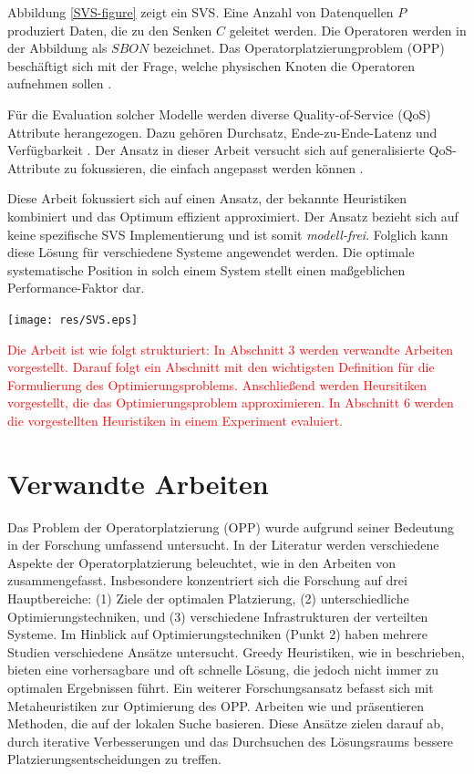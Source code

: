 \documentclass{article}
\begin{document}
Abbildung \ref{SVS-figure} zeigt ein SVS. Eine Anzahl von Datenquellen $P$ produziert Daten, die zu den Senken $C$ geleitet werden. Die Operatoren 
werden in der Abbildung als $SBON$ bezeichnet. Das Operatorplatzierungproblem (OPP) beschäftigt sich mit der Frage, 
welche physischen Knoten die Operatoren aufnehmen sollen \cite{network-aware-op}. 

Für die Evaluation solcher Modelle werden diverse Quality-of-Service (QoS) Attribute herangezogen. 
Dazu gehören Durchsatz, Ende-zu-Ende-Latenz und Verfügbarkeit \cite{efficient-operator-placement,cardellini-optimal_operatorplc}.
Der Ansatz in dieser Arbeit versucht sich auf generalisierte QoS-Attribute 
zu fokussieren, die einfach angepasst werden können \cite{efficient-operator-placement}.

Diese Arbeit fokussiert sich auf einen Ansatz, der bekannte Heuristiken kombiniert und das Optimum effizient approximiert. 
Der Ansatz bezieht sich auf keine spezifische SVS Implementierung und ist somit \textit{modell-frei}. Folglich kann diese Lösung für verschiedene Systeme angewendet werden.
Die optimale systematische Position in solch einem System stellt einen maßgeblichen Performance-Faktor dar. 


\begin{center}
    \texttt{[image: res/SVS.eps]}
    \label{SVS-figure}
\end{center}

\textcolor{red}{Die Arbeit ist wie folgt strukturiert: In Abschnitt 3 werden verwandte Arbeiten vorgestellt. 
Darauf folgt ein Abschnitt mit den wichtigsten Definition für die Formulierung des Optimierungsproblems. Anschließend werden Heursitiken vorgestellt, die das Optimierungsproblem approximieren.  
In Abschnitt 6 werden die vorgestellten Heuristiken in einem Experiment evaluiert.}

\section{Verwandte Arbeiten}
Das Problem der Operatorplatzierung (OPP) wurde aufgrund seiner Bedeutung in der Forschung umfassend untersucht. 
In der Literatur werden verschiedene Aspekte der Operatorplatzierung beleuchtet, wie in den Arbeiten von \cite{survey-placement-strategies,Starks2018} zusammengefasst. 
Insbesondere konzentriert sich die Forschung auf drei Hauptbereiche: (1) Ziele der optimalen Platzierung, (2) unterschiedliche Optimierungstechniken, und (3) verschiedene Infrastrukturen der verteilten Systeme.
Im Hinblick auf Optimierungstechniken (Punkt 2) haben mehrere Studien verschiedene Ansätze untersucht. 
Greedy Heuristiken, wie in \cite{greedy-distr.-svs} beschrieben, bieten eine vorhersagbare und oft schnelle Lösung, die jedoch nicht immer zu optimalen Ergebnissen führt.
Ein weiterer Forschungsansatz befasst sich mit Metaheuristiken zur Optimierung des OPP. 
Arbeiten wie \cite{whiteWater} und \cite{latency-estimation-local-search} präsentieren Methoden, die auf der lokalen Suche basieren. Diese Ansätze zielen darauf ab, durch iterative Verbesserungen und das Durchsuchen des Lösungsraums bessere Platzierungsentscheidungen zu treffen.
\end{document}
